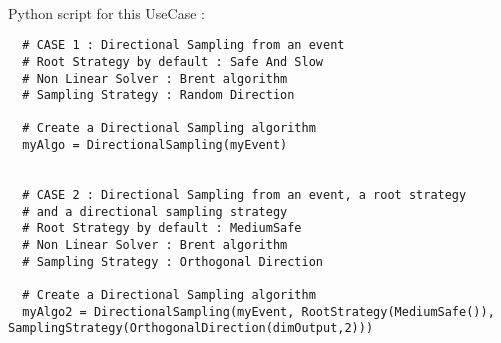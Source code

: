 \textspace\\
Python  script for this UseCase :


\begin{lstlisting}
  # CASE 1 : Directional Sampling from an event
  # Root Strategy by default : Safe And Slow
  # Non Linear Solver : Brent algorithm
  # Sampling Strategy : Random Direction

  # Create a Directional Sampling algorithm
  myAlgo = DirectionalSampling(myEvent)


  # CASE 2 : Directional Sampling from an event, a root strategy
  # and a directional sampling strategy
  # Root Strategy by default : MediumSafe
  # Non Linear Solver : Brent algorithm
  # Sampling Strategy : Orthogonal Direction

  # Create a Directional Sampling algorithm
  myAlgo2 = DirectionalSampling(myEvent, RootStrategy(MediumSafe()), SamplingStrategy(OrthogonalDirection(dimOutput,2)))
\end{lstlisting}

